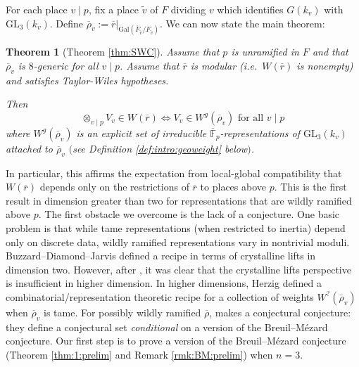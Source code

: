 \documentclass[oneside,a4paper,english, 11pt]{amsart}
\theoremstyle{plain}
\newtheorem{thm}{Theorem}[subsection]
\theoremstyle{plain}
\theoremstyle{plain}
\theoremstyle{plain}
\theoremstyle{plain}
\theoremstyle{plain}
\theoremstyle{definition}
\theoremstyle{definition}
\theoremstyle{definition}
\theoremstyle{remark}
\numberwithin{equation}{section}
\newcommand{\F}{\mathbb{F}}
\newcommand{\Gal}{\mathrm{Gal}}
\newcommand{\GL}{\mathrm{GL}}
\newcommand{\tld}[1]{\widetilde{#1}}
\newcommand{\rbar}{\overline{r}}
\newcommand{\rhobar}{\overline{\rho}}
\newcommand{\ovl}[1]{\overline{#1}}
\begin{document}
For each place $v \mid p$, fix a place $\tld{v}$ of $F$ dividing $v$ which identifies $G(k_v)$ with $\GL_3(k_v)$. 
Define $\rhobar_v := \rbar|_{\Gal(\overline{F}_{\tld{v}}/F_{\tld{v}})}$. 
We can now state the main theorem:
%

\begin{thm}[Theorem \ref{thm:SWC}]
\label{thm:5:prelim}  Assume that $p$ is unramified in $F$ and that $\rhobar_v$ is $8$-generic for all $v \mid p$.   Assume that $\rbar$ is modular (i.e.~$W(\rbar)$ is nonempty) and satisfies Taylor-Wiles hypotheses. 

Then 
\[
\otimes_{v \mid p} V_v \in W(\rbar) \Longleftrightarrow V_v \in  W^g(\rhobar_v) \text{ for all } v \mid p
\]
where $W^g(\rhobar_v)$ is an explicit set of irreducible $\ovl{\F}_p$-representations of $\GL_3(k_v)$ attached to $\rhobar_v$ $($see Definition \ref{def:intro:geoweight} below$)$. 
\end{thm}

\noindent In particular, this affirms the expectation from local-global compatibility that $W(\rbar)$ depends only on the restrictions of $\rbar$ to places above $p$. 
This is the first result in dimension greater than two for representations that are wildly ramified above $p$. 
The first obstacle we overcome is the lack of a conjecture. 
One basic problem is that while tame representations (when restricted to inertia) depend only on discrete data, wildly ramified representations vary in nontrivial moduli.
Buzzard--Diamond--Jarvis defined a recipe in terms of crystalline lifts in dimension two. 
However, after \cite{LLLM}, it was clear that the crystalline lifts perspective is  insufficient in higher dimension.  %
In higher dimensions, Herzig defined a combinatorial/representation theoretic recipe for a collection of weights $W^?(\rhobar_v)$ when $\rhobar_v$ is tame. 
For possibly wildly ramified $\rhobar$, \cite{GHS} makes a conjectural conjecture: they define a conjectural set \emph{conditional} on a version of the Breuil--M\'ezard conjecture. 
Our first step is to prove a version of the Breuil--M\'ezard conjecture (Theorem \ref{thm:1:prelim} and Remark \ref{rmk:BM:prelim}) when $n=3$. 
\end{document}
